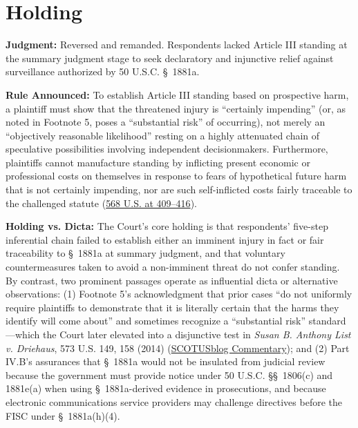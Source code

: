 \documentclass[12pt]{article}
\begin{document}
\section{Holding}

\textbf{Judgment:} Reversed and remanded. Respondents lacked Article III standing at the summary judgment stage to seek declaratory and injunctive relief against surveillance authorized by 50 U.S.C. \S~1881a.

\textbf{Rule Announced:} To establish Article III standing based on prospective harm, a plaintiff must show that the threatened injury is ``certainly impending'' (or, as noted in Footnote 5, poses a ``substantial risk'' of occurring), not merely an ``objectively reasonable likelihood'' resting on a highly attenuated chain of speculative possibilities involving independent decisionmakers. Furthermore, plaintiffs cannot manufacture standing by inflicting present economic or professional costs on themselves in response to fears of hypothetical future harm that is not certainly impending, nor are such self-inflicted costs fairly traceable to the challenged statute (\href{https://tile.loc.gov/storage-services/service/ll/usrep/usrep568/usrep568398/usrep568398.pdf}{568 U.S. at 409--416}).

\textbf{Holding vs. Dicta:} The Court's core holding is that respondents' five-step inferential chain failed to establish either an imminent injury in fact or fair traceability to \S~1881a at summary judgment, and that voluntary countermeasures taken to avoid a non-imminent threat do not confer standing. By contrast, two prominent passages operate as influential dicta or alternative observations: (1) Footnote 5's acknowledgment that prior cases ``do not uniformly require plaintiffs to demonstrate that it is literally certain that the harms they identify will come about'' and sometimes recognize a ``substantial risk'' standard---which the Court later elevated into a disjunctive test in \textit{Susan B. Anthony List v. Driehaus}, 573 U.S. 149, 158 (2014) (\href{https://www.scotusblog.com/2014/06/commentary-susan-b-anthony-list-clapper-footnote-5-and-the-state-of-article-iii-standing-doctrine/}{SCOTUSblog Commentary}); and (2) Part IV.B's assurances that \S~1881a would not be insulated from judicial review because the government must provide notice under 50 U.S.C. \S\S~1806(c) and 1881e(a) when using \S~1881a-derived evidence in prosecutions, and because electronic communications service providers may challenge directives before the FISC under \S~1881a(h)(4).
\end{document}
